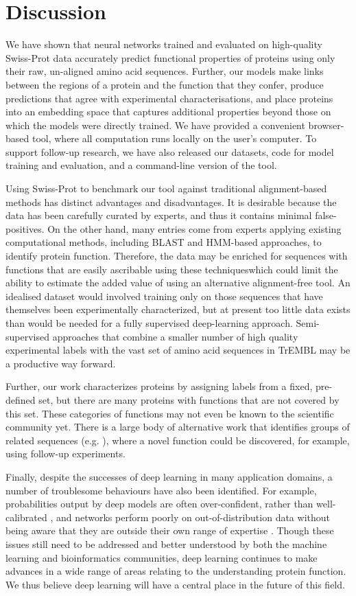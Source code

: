 \section*{Discussion}

We have shown that neural networks trained and evaluated on high-quality Swiss-Prot data accurately predict functional properties of proteins using only their raw, un-aligned amino acid sequences. Further, our models make links between the regions of a protein and the function that they confer, produce predictions that agree with experimental characterisations, and place proteins into an embedding space that captures additional properties beyond those on which the models were directly trained. We have provided a convenient browser-based tool, where all computation runs locally on the user's computer. To support follow-up research, we have also released our datasets, code for model training and evaluation, and a command-line version of the tool.

Using Swiss-Prot to benchmark our tool against traditional alignment-based methods has distinct advantages and disadvantages. It is desirable because the data has been carefully curated by experts, and thus it contains minimal false-positives. On the other hand, many entries come from experts applying existing computational methods, including BLAST and HMM-based approaches, to identify protein function. Therefore, the data may be enriched for sequences with functions that are easily ascribable using these techniqueswhich could limit the ability to estimate the added value of using an alternative alignment-free tool. An idealised dataset would involved training only on those sequences that have themselves been experimentally characterized, but at present  too little data exists than would be needed for a fully supervised deep-learning approach. Semi-supervised approaches that combine a smaller number of high quality experimental labels with the vast set of amino acid sequences in TrEMBL may be a productive way forward.

Further, our work characterizes proteins by assigning labels from a fixed, pre-defined set, but there are many proteins with functions that are not covered by this set. These categories of functions may not even be known to the scientific community yet. There is a large body of alternative work that identifies groups of related sequences (e.g. \cite{pmid12952885}), where a novel function could be discovered, for example, using follow-up experiments.

Finally, despite the successes of deep learning in many application domains, a number of troublesome behaviours have also been identified. For example, probabilities output by deep models are often over-confident, rather than well-calibrated \citep{guo}, and networks perform poorly on out-of-distribution data without being aware that they are outside their own range of expertise \citep{amoidei}. Though these issues still need to be addressed and better understood by both the machine learning and bioinformatics communities, deep learning continues to make advances in a wide range of areas relating to the understanding protein function. We thus believe deep learning will have a central place in the future of this field.



